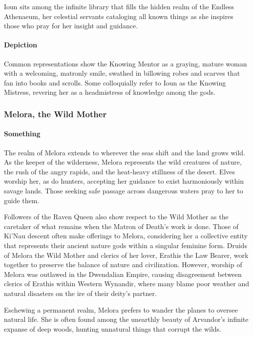 \documentclass[letterpaper,twocolumn,openany,nodeprecatedcode]{dndbook}
\begin{document}
Ioun sits among the infinite library that fills the hidden realm of the Endless Athenaeum,
her celestial servants cataloging all known things as she inspires those who pray for
her insight and guidance.

\paragraph{Depiction}
Common representations show the Knowing Mentor as a graying, mature woman with a welcoming,
matronly smile, swathed in billowing robes and scarves that fan into books and scrolls.
Some colloquially refer to Ioun as the Knowing Mistress, revering her as a headmistress
of knowledge among the gods.

\subsubsection{Melora, the Wild Mother}

\paragraph{Something}
The realm of Melora extends to wherever the seas shift and the land grows wild. As the
keeper of the wilderness, Melora represents the wild creatures of nature, the rush of the
angry rapids, and the heat-heavy stillness of the desert. Elves worship her, as do hunters,
accepting her guidance to exist harmoniously within savage lands. Those seeking safe passage
across dangerous waters pray to her to guide them.

Followers of the Raven Queen also show respect to the Wild Mother as the caretaker of
what remains when the Matron of Death’s work is done. Those of Ki’Nau descent often make
offerings to Melora, considering her a collective entity that represents their ancient nature
gods within a singular feminine form. Druids of Melora the Wild Mother and clerics of her
lover, Erathis the Law Bearer, work together to preserve the balance of nature and
civilization. However, worship of Melora was outlawed in the Dwendalian Empire, causing
disagreement between clerics of Erathis within Western Wynandir, where many blame poor
weather and natural disasters on the ire of their deity’s partner.

Eschewing a permanent realm, Melora prefers to wander the planes to oversee natural life.
She is often found among the unearthly beauty of Arvandor’s infinite expanse of deep woods,
hunting unnatural things that corrupt the wilds.
\end{document}
